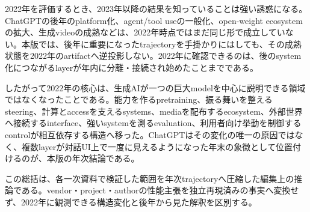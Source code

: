 2022年を評価するとき、2023年以降の結果を知っていることは強い誘惑になる。ChatGPTの後年のplatform化、agent/tool useの一般化、open-weight ecosystemの拡大、生成videoの成熟などは、2022年時点ではまだ同じ形で成立していない。本版では、後年に重要になったtrajectoryを手掛かりにはしても、その成熟状態を2022年のartifactへ逆投影しない。2022年に確認できるのは、後のsystem化につながるlayerが年内に分離・接続され始めたことまでである。\autocite{src-26aadbc0393f,src-2832ee43ab8f,src-811e1008822e,src-bc1a61aec959}


したがって2022年の核心は、生成AIが一つの巨大modelを中心に説明できる領域ではなくなったことである。能力を作るpretraining、振る舞いを整えるsteering、計算とaccessを支えるsystems、mediaを配布するecosystem、外部世界へ接続するinterface、強いsystemを測るevaluation、利用者向け挙動を制御するcontrolが相互依存する構造へ移った。ChatGPTはその変化の唯一の原因ではなく、複数layerが対話UI上で一度に見えるようになった年末の象徴として位置付けるのが、本版の年次結論である。\autocite{src-16a1a1dc486e,src-1e362767e63c,src-26aadbc0393f,src-27297a80fac0,src-2832ee43ab8f,src-2c38d2f354fa,src-6ffa5c4e64ca,src-811e1008822e,src-86ce6205a4ed,src-87477ad8b476,src-929080260e16,src-bc1a61aec959,src-e58f1e9c8754,src-e8da8e8f02bc}


\begin{claimboundary}
この総括は、各一次資料で検証した範囲を年次trajectoryへ圧縮した編集上の推論である。vendor・project・authorの性能主張を独立再現済みの事実へ変換せず、2022年に観測できる構造変化と後年から見た解釈を区別する。\autocite{src-1e362767e63c,src-87477ad8b476,src-e58f1e9c8754}
\end{claimboundary}

